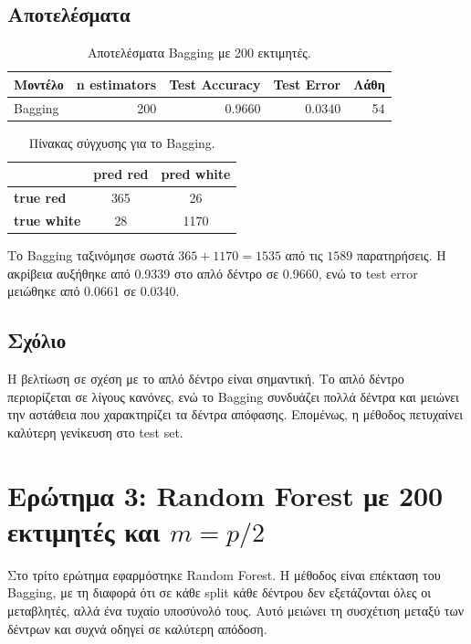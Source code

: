 \documentclass[12pt,a4paper]{article}
\begin{document}
\subsection{Αποτελέσματα}

\begin{table}[H]
\centering
\caption{Αποτελέσματα Bagging με 200 εκτιμητές.}
\begin{tabular}{lrrrr}
\toprule
\textbf{Μοντέλο} & \textbf{n estimators} & \textbf{Test Accuracy} & \textbf{Test Error} & \textbf{Λάθη} \\
\midrule
Bagging & 200 & 0.9660 & 0.0340 & 54 \\
\bottomrule
\end{tabular}
\end{table}

\begin{table}[H]
\centering
\caption{Πίνακας σύγχυσης για το Bagging.}
\begin{tabular}{lcc}
\toprule
& \textbf{pred red} & \textbf{pred white} \\
\midrule
\textbf{true red}   & 365 & 26 \\
\textbf{true white} & 28  & 1170 \\
\bottomrule
\end{tabular}
\end{table}

Το Bagging ταξινόμησε σωστά $365+1170=1535$ από τις $1589$ παρατηρήσεις.
Η ακρίβεια αυξήθηκε από 0.9339 στο απλό δέντρο σε 0.9660, ενώ το test error
μειώθηκε από 0.0661 σε 0.0340.

\subsection{Σχόλιο}

Η βελτίωση σε σχέση με το απλό δέντρο είναι σημαντική. Το απλό δέντρο
περιορίζεται σε λίγους κανόνες, ενώ το Bagging συνδυάζει πολλά δέντρα και
μειώνει την αστάθεια που χαρακτηρίζει τα δέντρα απόφασης. Επομένως, η μέθοδος
πετυχαίνει καλύτερη γενίκευση στο test set.

\section{Ερώτημα 3: Random Forest με 200 εκτιμητές και \texorpdfstring{$m=p/2$}{m=p/2}}

Στο τρίτο ερώτημα εφαρμόστηκε Random Forest. Η μέθοδος είναι επέκταση του
Bagging, με τη διαφορά ότι σε κάθε split κάθε δέντρου δεν εξετάζονται όλες οι
μεταβλητές, αλλά ένα τυχαίο υποσύνολό τους. Αυτό μειώνει τη συσχέτιση μεταξύ
των δέντρων και συχνά οδηγεί σε καλύτερη απόδοση.
\end{document}
